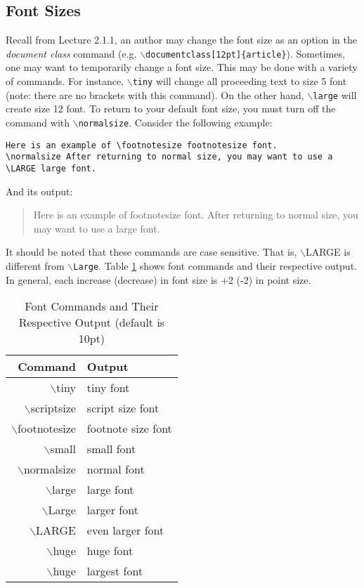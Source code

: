\documentclass{article}
\begin{document}
\subsection{Font Sizes}

Recall from Lecture 2.1.1, an author may change the font size as an option in the \textit{document class} command (e.g. \texttt{$\backslash$documentclass[12pt]\{article\}}). Sometimes, one may want to temporarily change a font size. This may be done with a variety of commands. For instance, \texttt{$\backslash$tiny} will change all proceeding text to \tiny size 5 font \normalsize(note: there are no brackets with this command). On the other hand, \texttt{$\backslash$large} will create \large size 12 font. \normalsize To return to your default font size, you must turn off the command with \texttt{$\backslash$normalsize}. Consider the following example:

\begin{verbatim}
Here is an example of \footnotesize footnotesize font. 
\normalsize After returning to normal size, you may want to use a
\LARGE large font.
\end{verbatim}

And its output:

\begin{quote}
Here is an example of \footnotesize footnotesize font. \normalsize After returning to normal size, you may want to use a \LARGE large font.
\end{quote}

It should be noted that these commands are case sensitive. That is, \texttt{$\backslash$}LARGE is different from \texttt{$\backslash$Large}. Table \ref{tbl:font} shows font commands and their respective output. In general, each increase (decrease) in font size is +2 (-2) in point size.

\begin{table}[!h] \caption{Font Commands and Their Respective Output (default is 10pt)} \label{tbl:font}
	\begin{center}
		\begin{tabular}{r l} 
		\hline
		Command & Output \\
		\hline
					$\backslash$tiny & \tiny tiny font \\
					$\backslash$scriptsize & \scriptsize script size font \\
					$\backslash$footnotesize & \footnotesize footnote size font \\
					$\backslash$small & \small small font \\
					$\backslash$normalsize & \normalsize normal font \\
					$\backslash$large & \large large font \\
					$\backslash$Large & \large larger font \\
					$\backslash$LARGE & \LARGE even larger font \\
					$\backslash$huge & \huge huge font \\
					$\backslash$huge & \Huge largest font \\		\end{tabular}
	\end{center}		
\end{table}
\end{document}
